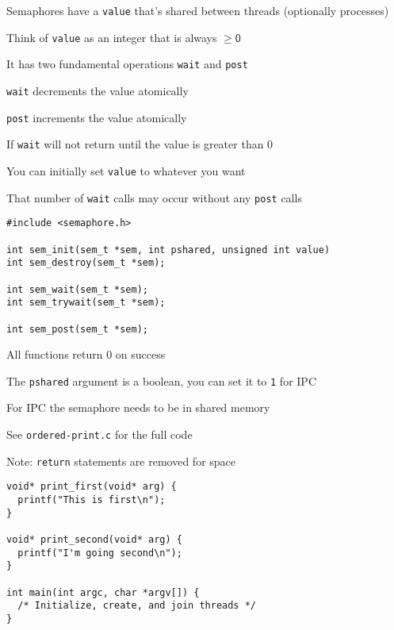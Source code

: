   \begin{slide}


    Semaphores have a {\tt value} that's shared between threads (optionally
    processes)

    \leftspace{}Think of {\tt value} as an integer that is always $\mathsf{\geq 0}$
    \medskip

    It has two fundamental operations {\tt wait} and {\tt post}

    \leftspace{}\texttt{wait} decrements the value atomically

    \leftspace{}\texttt{post} increments the value atomically
    \medskip

    If \texttt{wait} will not return until the value is greater than 0
    \medskip

    You can initially set \texttt{value} to whatever you want

    \leftspace{}That number of \texttt{wait} calls may occur without any
    \texttt{post} calls

  \end{slide}

  \begin{slide}

  
    \begin{verbatim}
#include <semaphore.h>

int sem_init(sem_t *sem, int pshared, unsigned int value)
int sem_destroy(sem_t *sem);

int sem_wait(sem_t *sem);
int sem_trywait(sem_t *sem);

int sem_post(sem_t *sem);
    \end{verbatim}
    \medskip

    All functions return 0 on success
    \medskip

    The \texttt{pshared} argument is a boolean, you can set it to \texttt{1} for
    IPC

    \leftspace{}For IPC the semaphore needs to be in shared memory

  \end{slide}

  \begin{slide}


    See \texttt{ordered-print.c} for the full code

    \leftspace{}Note: \texttt{return} statements are removed for space
    \medskip

    \begin{verbatim}
void* print_first(void* arg) {
  printf("This is first\n");
}

void* print_second(void* arg) {
  printf("I'm going second\n");
}

int main(int argc, char *argv[]) {
  /* Initialize, create, and join threads */
}
    \end{verbatim}

  \end{slide}

